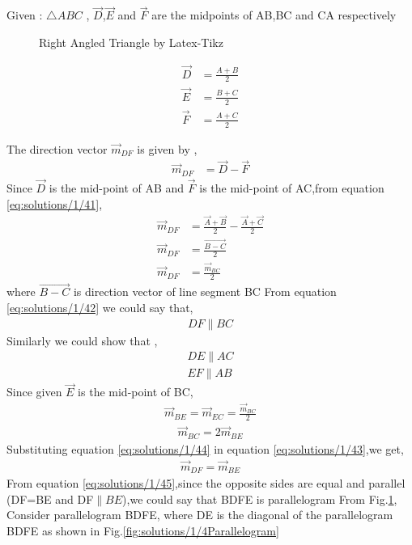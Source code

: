 Given : $\triangle{ABC}$
, $\vec{D}$,$\vec{E}$ and $\vec{F}$ are the midpoints of AB,BC and CA respectively

\begin{figure}[!ht]
\centering
\resizebox{\columnwidth}{!}{}
\caption{Right Angled Triangle by Latex-Tikz}
\label{fig:solutions/1/4tri_right_angle}
\end{figure}
\begin{align}
    \vec{D}&=\frac{A+B}{2}\\
    \vec{E}&=\frac{B+C}{2}\\
    \vec{F}&=\frac{A+C}{2}
\end{align}

The direction vector $\vec{m}_{DF}$ is given by ,
\begin{align}
    \vec{m}_{DF}&=\vec{D}-\vec{F} \label{eq:solutions/1/41}
\end{align}
Since $\vec{D}$ is the mid-point of AB and $\vec{F}$ is the mid-point of AC,from equation \ref{eq:solutions/1/41},
\begin{align}
    \vec{m}_{DF}&=\frac{\vec{A}+\vec{B}}{2}-\frac{\vec{A}+\vec{C}}{2}\\
    \vec{m}_{DF}&=\frac{\vec{B-C}}{2} \label{eq:solutions/1/42}\\
    \vec{m}_{DF}&=\frac{\vec{m}_{BC}}{2} \label{eq:solutions/1/43}
\end{align}
where $\vec{B-C}$ is direction vector of line segment BC
From equation \ref{eq:solutions/1/42} we could say that,
\begin{align}
    DF\parallel{BC}
\end{align}
Similarly we could show that , 
\begin{align}
    DE\parallel{AC}\\
    EF\parallel{AB}
\end{align}
Since given $\vec{E}$ is the mid-point of BC,
\begin{align}
    \vec{m}_{BE}=\vec{m}_{EC}=\frac{{\vec{m}_{BC}}}{2}
\end{align}
\begin{align}
    \vec{m}_{BC}=2\vec{m}_{BE}\label{eq:solutions/1/44}
\end{align}
Substituting equation \ref{eq:solutions/1/44} in equation \ref{eq:solutions/1/43},we get,
\begin{align}
    \vec{m}_{DF}=\vec{m}_{BE} \label{eq:solutions/1/45}
\end{align}
From equation \ref{eq:solutions/1/45},since the opposite sides are equal and parallel (DF=BE and DF$\parallel{BE}$),we could say that BDFE is parallelogram
From Fig.\ref{fig:solutions/1/4tri_right_angle}, 
Consider parallelogram BDFE, where DE is the diagonal of the parallelogram BDFE as shown in Fig.\ref{fig:solutions/1/4Parallelogram}

